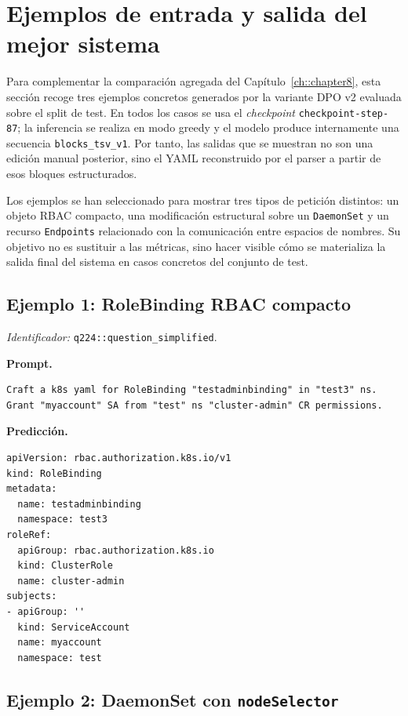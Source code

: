 \section{Ejemplos de entrada y salida del mejor sistema}

Para complementar la comparación agregada del Capítulo~\ref{ch::chapter8}, esta sección recoge tres ejemplos concretos generados por la variante DPO v2 evaluada sobre el split de test. En todos los casos se usa el \textit{checkpoint} \texttt{checkpoint-step-87}; la inferencia se realiza en modo greedy y el modelo produce internamente una secuencia \texttt{blocks\_tsv\_v1}. Por tanto, las salidas que se muestran no son una edición manual posterior, sino el YAML reconstruido por el parser a partir de esos bloques estructurados.

Los ejemplos se han seleccionado para mostrar tres tipos de petición distintos: un objeto RBAC compacto, una modificación estructural sobre un \texttt{DaemonSet} y un recurso \texttt{Endpoints} relacionado con la comunicación entre espacios de nombres. Su objetivo no es sustituir a las métricas, sino hacer visible cómo se materializa la salida final del sistema en casos concretos del conjunto de test.

\subsection*{Ejemplo 1: RoleBinding RBAC compacto}

\noindent\textit{Identificador:} \texttt{q224::question\_simplified}.

\noindent\textbf{Prompt.}
\begin{lstlisting}[style=yamlblock]
Craft a k8s yaml for RoleBinding "testadminbinding" in "test3" ns. Grant "myaccount" SA from "test" ns "cluster-admin" CR permissions.
\end{lstlisting}

\noindent\textbf{Predicción.}
\begin{lstlisting}[style=yamlblock]
apiVersion: rbac.authorization.k8s.io/v1
kind: RoleBinding
metadata:
  name: testadminbinding
  namespace: test3
roleRef:
  apiGroup: rbac.authorization.k8s.io
  kind: ClusterRole
  name: cluster-admin
subjects:
- apiGroup: ''
  kind: ServiceAccount
  name: myaccount
  namespace: test
\end{lstlisting}

\subsection*{Ejemplo 2: DaemonSet con \texttt{nodeSelector}}

